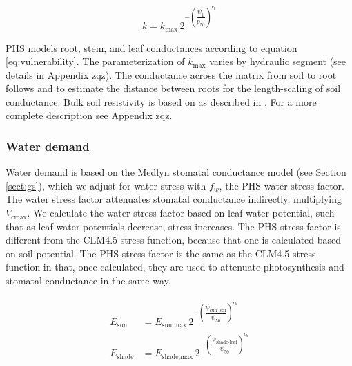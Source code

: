 \documentclass[draft,linenumbers]{agujournal}
\begin{document}
     \begin{linenomath*}
     \begin{equation}
     \label{eq:vulnerability}
     k = k_{\text{max}} \, 2^{-\left(\dfrac{\psi_1}{p_{50}}\right)^{c_k}}
     \end{equation}
     \end{linenomath*}
     
     PHS models root, stem, and leaf conductances according to equation \ref{eq:vulnerability}.
     The parameterization of $k_{\text{max}}$ varies by hydraulic segment (see details in Appendix zqz).
     The conductance across the matrix from soil to root follows \citet{williams2001} and \citet{bonan2014} 
     to estimate the distance between roots for the length-scaling of soil conductance.
     Bulk soil resistivity is based on \citet{clapp1978} as described in \citet{oleson2013}.
     For a more complete description see Appendix zqz.
    
    \subsubsection{Water demand}
    \label{sect:demand}
    
    Water demand is based on the Medlyn stomatal conductance model (see Section \ref{sect:gs}), 
    which we adjust for water stress with $f_w$, the PHS water stress factor. 
    The water stress factor attenuates stomatal conductance indirectly, multiplying $V_{\text{cmax}}$.
    We calculate the water stress factor based on leaf water potential, such that 
    as leaf water potentials decrease, stress increases.
    The PHS stress factor is different from the CLM4.5 stress function, because that one 
    is calculated based on soil potential.
    The PHS stress factor is the same as the CLM4.5 stress function in that, once calculated, they are used
    to attenuate photosynthesis and stomatal conductance in the same way.

    
     \begin{linenomath*}
     \begin{eqnarray}
     \begin{aligned}
     \label{eq:demand}
     E_{\text{sun}}     &= E_{\text{sun,max}} \, 2^{-\left(\dfrac{\psi_{\text{sun-leaf}}}{\psi_{50}}\right)^{c_k}} \\
     E_{\text{shade}} &= E_{\text{shade,max}} \, 2^{-\left(\dfrac{\psi_{\text{shade-leaf}}}{\psi_{50}}\right)^{c_k}}
     \end{aligned}
     \end{eqnarray}
     \end{linenomath*}
    
\end{document}
